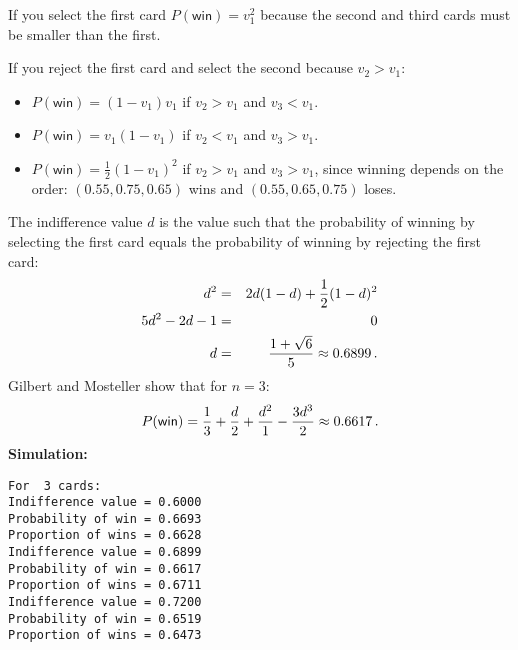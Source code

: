 
If you select the first card $P(\textsf{win})=v_1^2$ because the second and third cards must be smaller than the first.

If you reject the first card and select the second because $v_2>v_1$:
\begin{itemize}
\item $P(\textsf{win})=(1-v_1)v_1$ if $v_2>v_1$ and $v_3<v_1$.
\item $P(\textsf{win})=v_1(1-v_1)$ if $v_2<v_1$ and $v_3>v_1$.
\item $P(\textsf{win})=\frac{1}{2}(1-v_1)^2$ if $v_2>v_1$ and $v_3>v_1$, since winning depends on the order: $(0.55, 0.75, 0.65)$ wins and $(0.55, 0.65, 0.75)$ loses.
\end{itemize}

The indifference value $d$ is the value such that the probability of winning by selecting the first card equals the probability of winning by rejecting the first card:
\begin{eqnarray*}
d^2 &=& 2d(1-d) + \frac{1}{2}(1-d)^2\\
5d^2 - 2d -1 &=&0\\
d&=& \displaystyle\frac{1+\sqrt{6}}{5}\approx 0.6899\,.
\end{eqnarray*}
Gilbert and Mosteller \cite[page~55]{gilbert} show that for $n=3$:
\[
P(\textsf{win}) = \displaystyle\frac{1}{3}+\displaystyle\frac{d}{2}+\displaystyle\frac{d^2}{1}-\displaystyle\frac{3d^3}{2}\approx 0.6617\,.
\]
\textbf{Simulation:}
\begin{verbatim}
For  3 cards:
Indifference value = 0.6000
Probability of win = 0.6693
Proportion of wins = 0.6628
Indifference value = 0.6899
Probability of win = 0.6617
Proportion of wins = 0.6711
Indifference value = 0.7200
Probability of win = 0.6519
Proportion of wins = 0.6473
\end{verbatim}


